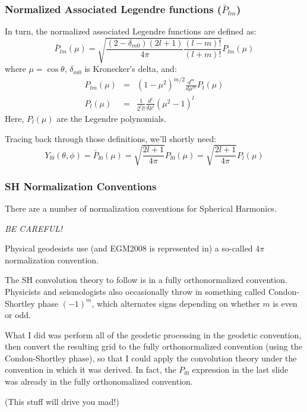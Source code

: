 \documentclass[aspectratio=43,mathserif]{beamer}
\begin{document}
\begin{frame}
\frametitle{Normalized Associated Legendre functions ($\bar{P}_{l m}$)}
In turn, the normalized associated Legendre functions are defined as:
$$ \bar{P}_{lm}(\mu) = \sqrt{\frac{(2 - \delta_{m0})(2 l + 1)}{4 \pi} \frac{(l-m)!}{(l+m)!}} P_{lm}(\mu)$$
where \(\mu = \cos \theta\), \(\delta_{m0}\) is Kronecker's delta, and:
\begin{eqnarray*}
P_{lm}(\mu) &= &(1-\mu^2)^{m/2} \frac{d^m}{d\mu^m} P_l(\mu) \\
P_l(\mu) &= &\frac{1}{2^l l!} \frac{d^l}{d\mu^l} (\mu^2 -1)^l
\end{eqnarray*}
Here, \(P_l(\mu)\) are the Legendre polynomials.

Tracing back through those definitions, we'll shortly need:
\[
Y_{l0}(\theta,\phi) = \bar{P}_{l0}(\mu) = \sqrt{\frac{2l + 1}{4 \pi}} P_{l0}(\mu) = \sqrt{\frac{2l + 1}{4 \pi}}P_l(\mu)
\]

\end{frame}


\begin{frame}
\frametitle{SH Normalization Conventions}
There are a number of normalization conventions for Spherical Harmonics. 

\emph{BE CAREFUL!}

Physical geodesists use (and EGM2008 is represented in) a so-called \(4\pi\) normalization convention.

The SH convolution theory to follow is in a fully orthonormalized convention. Physicists and seismologists also occasionally throw in something called Condon-Shortley phase \((-1)^m\), which alternates signs depending on whether \(m\) is even or odd.

What I did was perform all of the geodetic processing in the geodetic convention, then convert the resulting grid to the fully orthonormalized convention (using the Condon-Shortley phase), so that I could apply the convolution theory under the convention in which it was derived. In fact, the \(P_{l0}\) expression in the last slide was already in the fully orthonomalized convention.

(This stuff will drive you mad!)


\end{frame}
\end{document}
